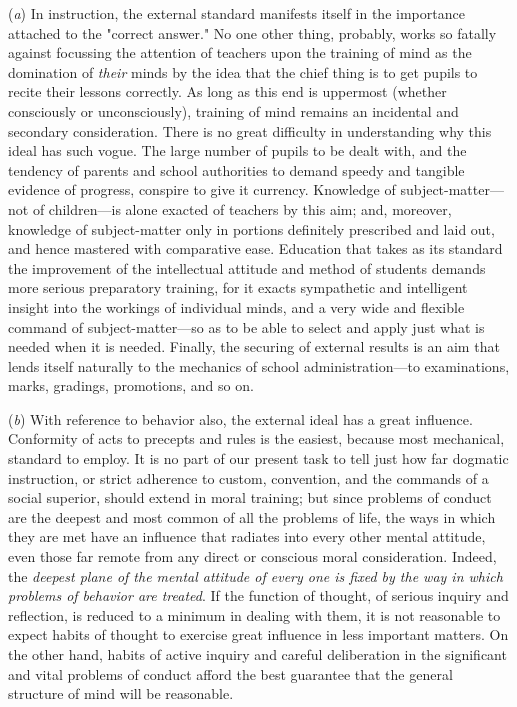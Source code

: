 \documentclass[showtrims,ustradepaper]{memoir}
\begin{document}
(\emph{a}) In instruction, the external standard manifests itself in the
importance attached to the "correct answer." No one other thing,
probably, works so fatally against focussing the attention of teachers
upon the training of mind as the domination of \emph{their} minds by the
idea that the chief thing is to get pupils to recite their lessons
correctly.
As long as this end is uppermost (whether consciously or unconsciously),
training of mind remains an incidental and secondary consideration.
There is no great difficulty in understanding why this ideal has such
vogue. The large number of pupils to be dealt with, and the tendency of
parents and school authorities to demand speedy and tangible evidence of
progress, conspire to give it currency. Knowledge of
subject-matter---not of children---is alone exacted of teachers by this
aim; and, moreover, knowledge of subject-matter only in portions
definitely prescribed and laid out, and hence mastered with comparative
ease. Education that takes as its standard the improvement of the
intellectual attitude and method of students demands more serious
preparatory training, for it exacts sympathetic and intelligent insight
into the workings of individual minds, and a very wide and flexible
command of subject-matter---so as to be able to select and apply just
what is needed when it is needed. Finally, the securing of external
results is an aim that lends itself naturally to the mechanics of school
administration---to examinations, marks, gradings, promotions, and so
on.


(\emph{b}) With reference to behavior also, the external ideal has a
great influence. Conformity of acts to precepts and rules is the
easiest, because most mechanical, standard to employ. It is no part of
our present task to tell just how far dogmatic instruction, or strict
adherence to custom, convention, and the commands of a social superior,
should extend in moral training; but since problems of conduct are the
deepest and most common of all the problems of life, the ways in which
they are met have an influence that radiates into every other mental
attitude, even those far remote from
any
direct or conscious moral consideration. Indeed, the \emph{deepest plane
of the mental attitude of every one is fixed by the way in which
problems of behavior are treated}. If the function of thought, of
serious inquiry and reflection, is reduced to a minimum in dealing with
them, it is not reasonable to expect habits of thought to exercise great
influence in less important matters. On the other hand, habits of active
inquiry and careful deliberation in the significant and vital problems
of conduct afford the best guarantee that the general structure of mind
will be
reasonable.
\end{document}
